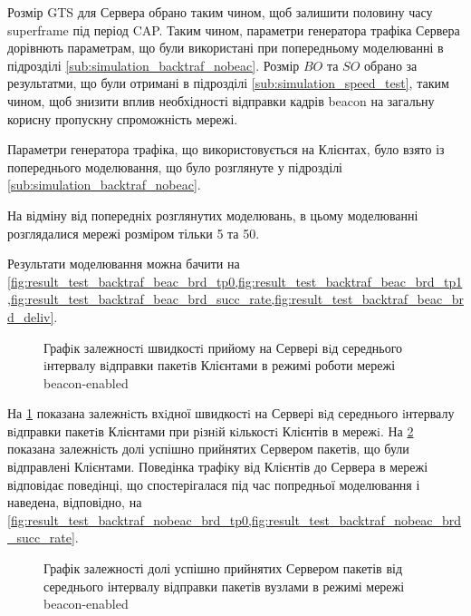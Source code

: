 \documentclass[a4paper,ukrainian,utf8,nocolumnsxix,floatsection,equationsection]{eskdtext}
\newcommand{\longcaption}[1]{\captionsetup{style=figureLongCaption}\caption{#1}}
\newcommand{\bem}[0]{beacon-enabled\xspace}
\begin{document}
Розмір GTS для Сервера обрано таким чином, щоб залишити половину часу superframe під період CAP. Таким чином, параметри генератора  трафіка Сервера  дорівнють параметрам, що були використані при попередньому моделюванні в підрозділі \ref{sub:simulation_backtraf_nobeac}. Розмір $BO$ та $SO$ обрано за результатми, що були отримані в підрозділі \ref{sub:simulation_speed_test}, таким чином, щоб знизити вплив необхідності відправки кадрів beacon на загальну корисну пропускну спроможність мережі.

Параметри генератора трафіка, що використовується на Клієнтах, було взято із попереднього моделювання, що було розглянуте у підрозділі \ref{sub:simulation_backtraf_nobeac}.

На відміну від попередніх розглянутих моделювань, в цьому моделюванні розглядалися мережі розміром тільки 5 та 50. %

Результати моделювання можна бачити на \cref{fig:result_test_backtraf_beac_brd_tp0,fig:result_test_backtraf_beac_brd_tp1,fig:result_test_backtraf_beac_brd_succ_rate,fig:result_test_backtraf_beac_brd_deliv}.

\begin{figure}[hbp]
	\centering
	\longcaption{\label{fig:result_test_backtraf_beac_brd_tp0}Графiк залежностi швидкостi прийому на Сервері вiд середнього iнтервалу вiдправки пакетiв Клієнтами в режимі роботи мережі \bem}
\end{figure}

На \cref{fig:result_test_backtraf_beac_brd_tp0} показана залежнiсть вхiдної швидкостi на Сервері вiд середнього iнтервалу вiдправки пакетiв Клієнтами при рiзнiй кiлькостi Клієнтів в мережi. На \cref{fig:result_test_backtraf_beac_brd_succ_rate} показана залежність долі успішно прийнятих Сервером пакетів, що були відправлені Клієнтами. Поведінка трафіку від Клієнтів до Сервера в мережі відповідає поведінці, що спостерігалася під час попредньої моделювання і наведена, відповідно, на \cref{fig:result_test_backtraf_nobeac_brd_tp0,fig:result_test_backtraf_nobeac_brd_succ_rate}. 

\begin{figure}[hbp]
	\centering
	\caption{\label{fig:result_test_backtraf_beac_brd_succ_rate}Графік залежності долі успішно прийнятих Сервером пакетів від середнього інтервалу відправки пакетів вузлами в режимі мережі \bem}
\end{figure}
\end{document}
